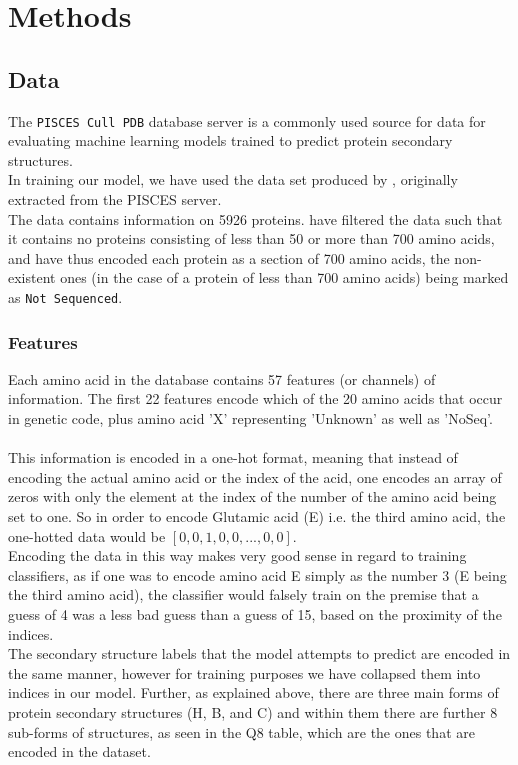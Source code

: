 \section{Methods}

\subsection{Data}
The \texttt{PISCES Cull PDB} database server \citep{wang-2003} is a commonly used source for data for evaluating 
machine learning models trained to predict protein secondary structures.\\
In training our model, we have used the data set produced by \cite{zhou-and-troyanskaya-2014}, originally extracted from the PISCES server.\\
The data contains information on 5926 proteins. \citeauthor{zhou-and-troyanskaya-2014} have filtered the data such that it contains no proteins consisting of less than 50 or more than 700 amino acids, and have thus encoded each protein as a section of 700 amino acids, the non-existent ones (in the case of a protein of less than 700 amino acids) being marked as \texttt{Not Sequenced}.

\subsubsection{Features}
Each amino acid in the database contains 57 features (or channels) of information. The first 22 features encode which of the 20 amino acids that occur in genetic code, plus amino acid 'X' representing 'Unknown' as well as 'NoSeq'.\\
\\
This information is encoded in a one-hot format, meaning that instead of encoding the actual amino acid or the index of the acid, one encodes an array of zeros with only the element at the index of the number of the amino acid being set to one. So in order to encode Glutamic acid (E) i.e. the third amino acid, the one-hotted data would be $[0, 0, 1, 0, 0, ... , 0, 0]$. \\
Encoding the data in this way makes very good sense in regard to training classifiers, as if one was to encode amino acid E simply as the number 3 (E being the third amino acid), the classifier would falsely train on the premise that a guess of 4 was a less bad guess than a guess of 15, based on the proximity of the indices.\\
The secondary structure labels that the model attempts to predict are encoded in the same manner, however for training purposes we have collapsed them into indices in our model. Further, as explained above, there are three main forms of protein secondary structures (H, B, and C) and within them there are further 8 sub-forms of structures, as seen in  the Q8 table, which are the ones that are encoded in the dataset.

